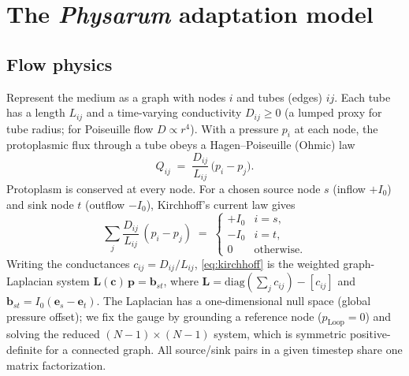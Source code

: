 \documentclass[11pt]{article}
\newcommand{\D}{D}
\begin{document}
\section{The \emph{Physarum} adaptation model}
\subsection{Flow physics}
Represent the medium as a graph with nodes $i$ and tubes (edges) $ij$. Each tube has a
length $L_{ij}$ and a time-varying conductivity $\D_{ij}\ge 0$ (a lumped proxy for tube
radius; for Poiseuille flow $\D \propto r^4$). With a pressure $p_i$ at each node, the
protoplasmic flux through a tube obeys a Hagen--Poiseuille (Ohmic) law
\begin{equation}
Q_{ij} \;=\; \frac{\D_{ij}}{L_{ij}}\,\bigl(p_i - p_j\bigr).
\label{eq:flux}
\end{equation}
Protoplasm is conserved at every node. For a chosen source node $s$ (inflow $+I_0$) and
sink node $t$ (outflow $-I_0$), Kirchhoff's current law gives
\begin{equation}
\sum_{j} \frac{\D_{ij}}{L_{ij}}\,(p_i-p_j)
\;=\;
\begin{cases}
+I_0 & i=s,\\
-I_0 & i=t,\\
0 & \text{otherwise.}
\end{cases}
\label{eq:kirchhoff}
\end{equation}
Writing the conductances $c_{ij}=\D_{ij}/L_{ij}$, \eqref{eq:kirchhoff} is the weighted
graph-Laplacian system $\mathbf{L}(\mathbf{c})\,\mathbf{p}=\mathbf{b}_{st}$, where
$\mathbf{L}=\mathrm{diag}(\sum_j c_{ij})-[c_{ij}]$ and $\mathbf{b}_{st}=I_0(\mathbf{e}_s-\mathbf{e}_t)$.
The Laplacian has a one-dimensional null space (global pressure offset); we fix the gauge
by grounding a reference node ($p_{\text{Loop}}=0$) and solving the reduced
$(N\!-\!1)\times(N\!-\!1)$ system, which is symmetric positive-definite for a connected
graph. All source/sink pairs in a given timestep share one matrix factorization.
\end{document}
